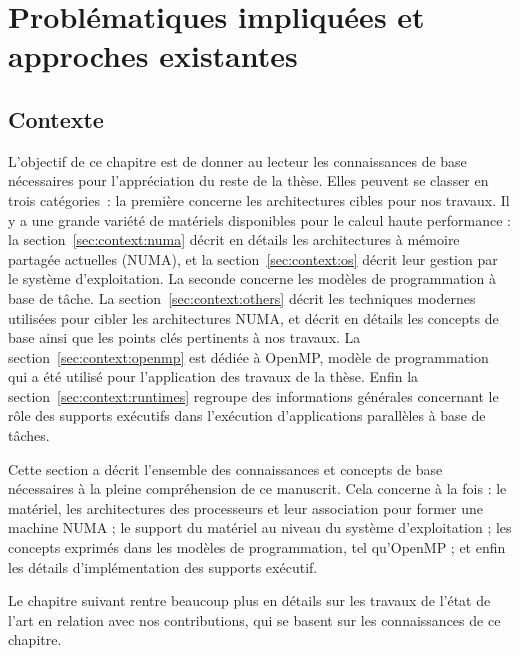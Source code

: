 \part{Problématiques impliquées et approches existantes}

\chapter{Contexte}\label{chap:contexte}
\chaptertoc
\vfill

\pagebreak

L'objectif de ce chapitre est de donner au lecteur les connaissances de base nécessaires pour l'appréciation du reste de la thèse.
Elles peuvent se classer en trois catégories~: la première concerne les architectures cibles pour nos travaux. Il y a une grande variété de matériels disponibles pour le calcul haute performance : la section~\ref{sec:context:numa} décrit en détails les architectures à mémoire partagée actuelles (NUMA), et la section~\ref{sec:context:os} décrit leur gestion par le système d'exploitation.
La seconde concerne les modèles de programmation à base de tâche. La section~\ref{sec:context:others} décrit les techniques modernes utilisées pour cibler les architectures NUMA, et décrit en détails les concepts de base ainsi que les points clés pertinents à nos travaux. La section~\ref{sec:context:openmp} est dédiée à OpenMP, modèle de programmation qui a été utilisé pour l'application des travaux de la thèse.
Enfin la section~\ref{sec:context:runtimes} regroupe des informations générales concernant le rôle des supports exécutifs dans l'exécution d'applications parallèles à base de tâches.







\bigskip

Cette section a décrit l'ensemble des connaissances et concepts de base nécessaires à la pleine compréhension de ce manuscrit.
Cela concerne à la fois : le matériel, les architectures des processeurs et leur association pour former une machine NUMA ; le support du matériel au niveau du système d'exploitation ; les concepts exprimés dans les modèles de programmation, tel qu'OpenMP ; et enfin les détails d'implémentation des supports exécutif.

Le chapitre suivant rentre beaucoup plus en détails sur les travaux de l'état de l'art en relation avec nos contributions, qui se basent sur les connaissances de ce chapitre.
